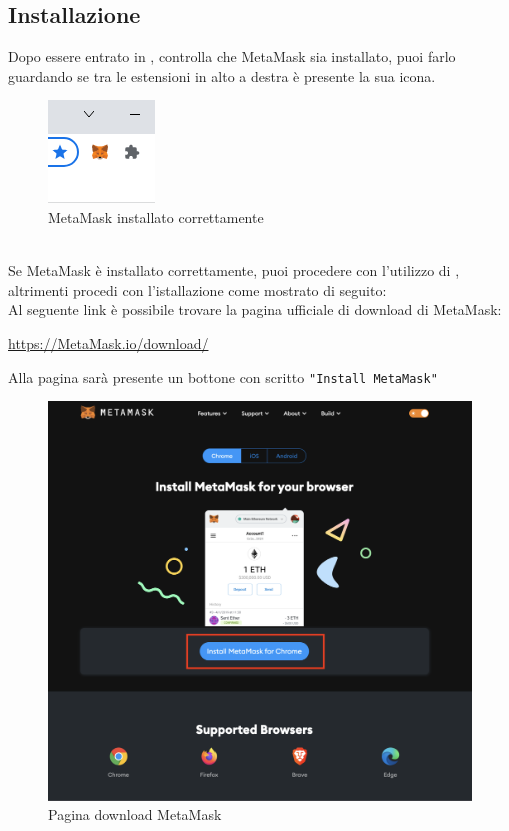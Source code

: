 \subsection{Installazione}
Dopo essere entrato in \projectName{}, controlla che MetaMask sia installato, puoi farlo guardando se tra le estensioni in alto a destra è presente la sua icona.
    \begin{figure}[H]
        \centering
        \includegraphics{immagini/MetaMask/MetaMask_installed.png}
        \caption{MetaMask installato correttamente}
    \end{figure}
\textbf{}\\
 Se MetaMask è installato correttamente, puoi procedere con l'utilizzo di \projectName, altrimenti procedi con l'istallazione come mostrato di seguito:\\
 Al seguente link è possibile trovare la pagina ufficiale di download di MetaMask:
 \begin{center}
     \url{https://MetaMask.io/download/}
 \end{center}
 Alla pagina sarà presente un bottone con scritto \texttt{"Install MetaMask"}
 \begin{figure}[H]
    \centering
    \includegraphics[scale=0.3]{immagini/MetaMask/install-MetaMask.png}
    \caption{Pagina download MetaMask}
\end{figure}
